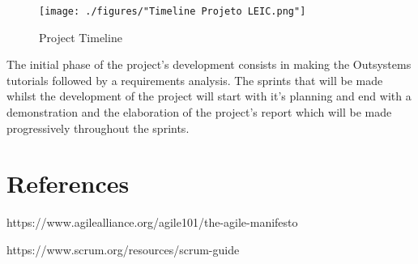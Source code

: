 \documentclass[a4paper,openright,12pt]{report}
\begin{document}
\begin{figure}[h]
  \texttt{[image: ./figures/"Timeline Projeto LEIC.png"]}
  \caption{Project Timeline}
  \label{fig:schedule}
\end{figure}

The initial phase of the project's development consists in making the Outsystems tutorials followed by a requirements analysis. The sprints that will be made whilst the development of the project will start with it's planning and end with a demonstration and the elaboration of the project's report which will be made progressively throughout the sprints.

\section*{References}
\begin{enumerate}[label={[\arabic*]}]
  \item https://www.agilealliance.org/agile101/the-agile-manifesto
  \item https://www.scrum.org/resources/scrum-guide
\end{enumerate}
\end{document}
